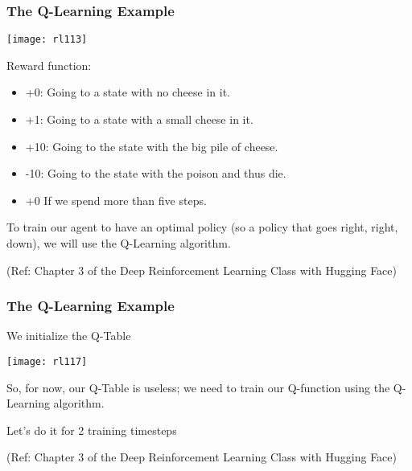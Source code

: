 \begin{frame}[fragile]\frametitle{The Q-Learning Example}


\begin{center}
\texttt{[image: rl113]}
\end{center}

Reward function:

\begin{itemize}
\item +0: Going to a state with no cheese in it.
\item +1: Going to a state with a small cheese in it.
\item +10: Going to the state with the big pile of cheese.
\item -10: Going to the state with the poison and thus die.
\item +0 If we spend more than five steps.
\end{itemize}

To train our agent to have an optimal policy (so a policy that goes right, right, down), we will use the Q-Learning algorithm.


{\tiny (Ref: Chapter 3 of the Deep Reinforcement Learning Class with Hugging Face)}

\end{frame}

\begin{frame}[fragile]\frametitle{The Q-Learning Example}

We initialize the Q-Table

\begin{center}
\texttt{[image: rl117]}
\end{center}

So, for now, our Q-Table is useless; we need to train our Q-function using the Q-Learning algorithm.

Let's do it for 2 training timesteps

{\tiny (Ref: Chapter 3 of the Deep Reinforcement Learning Class with Hugging Face)}

\end{frame}

